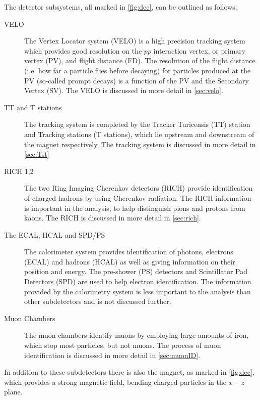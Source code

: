 The detector subsystems, all marked in \autoref{fig:dec}, can be outlined as follows:
\begin{description}
\item [VELO] The Vertex Locator system (\Gls{VELO}) is a high precision tracking system which provides good resolution on the $pp$ interaction vertex, or primary vertex (\Gls{PV}), and flight distance (\Gls{FD}). The resolution of the flight distance (i.e. how far a particle flies before decaying) for particles produced at the PV (so-called \gls{prompt} decays) is a function of the PV and the Secondary Vertex (SV). The VELO is discussed in more detail in \autoref{sec:velo}.
\item [TT and T stations] The tracking system is completed by the Tracker Turicensis (TT) station and Tracking stations (T stations), which lie upstream and downstream of the magnet respectively. The tracking system is discussed in more detail in \autoref{sec:Tst} %
\item [RICH 1,2] The two Ring Imaging Cherenkov detectors (\Gls{RICH}) provide identification of charged hadrons by using Cherenkov radiation. The RICH information is important in the \Lbpi analysis, to help distinguish pions and protons from kaons. The RICH is discussed in more detail in \autoref{sec:rich}.
\item [The ECAL, HCAL and SPD/PS] The calorimeter system provides identification of photons, electrons (\Gls{ECAL}) and hadrons (\Gls{HCAL}) as well as giving information on their position and energy. The pre-shower (\Gls{PS}) detectors and Scintillator Pad Detectors (\Gls{SPD}) are used to help electron identification. The information provided by the calorimetry system is less important to the \Lbpi analysis than other subdetectors and is not discussed further.
\item [Muon Chambers]  The muon chambers identify muons by employing large amounts of iron, which stop most particles, but not muons. The process of muon identification is discussed in more detail in \autoref{sec:muonID}.
\end{description}

In addition to these subdetectors there is also the magnet, as marked in \autoref{fig:dec}, which provides a strong magnetic field, bending charged particles in the $x - z$ plane. %

